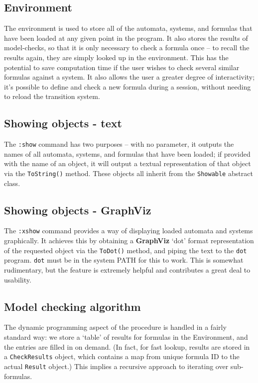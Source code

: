 \documentclass[11pt]{article}
\theoremstyle{definition}
\begin{document}
\subsection{Environment}

The environment is used to store all of the automata, systems, and formulas
that have been loaded at any given point in the program. It also stores the
results of model-checks, so that it is only necessary to check a formula once
-- to recall the results again, they are simply looked up in the environment.
This has the potential to save computation time if the user wishes to check
several similar formulas against a system. It also allows the user a greater
degree of interactivity; it's possible to define and check a new formula during
a session, without needing to reload the transition system.


\subsection{Showing objects - text}

The \texttt{:show} command has two purposes -- with no parameter, it outputs
the names of all automata, systems, and formulas that have been loaded; if
provided with the name of an object, it will output a textual representation of
that object via the \texttt{ToString()} method. These objects all inherit from
the \texttt{Showable} abstract class.

\subsection{Showing objects - GraphViz}

The \texttt{:xshow} command provides a way of displaying loaded automata and
systems graphically. It achieves this by obtaining a \textbf{GraphViz} `dot'
format representation of the requested object via the \texttt{ToDot()} method,
and piping the text to the \texttt{dot} program. \texttt{dot} must be in the
system PATH for this to work. This is somewhat rudimentary, but the feature is
extremely helpful and contributes a great deal to usability.

\subsection{Model checking algorithm}

The dynamic programming aspect of the procedure is handled in a fairly standard
way: we store a `table' of results for formulas in the Environment, and the
entries are filled in on demand. (In fact, for fast lookup, results are stored
in a \texttt{CheckResults} object, which contains a map from unique formula ID
to the actual \texttt{Result} object.) This implies a recursive approach to
iterating over sub-formulas.
\end{document}
